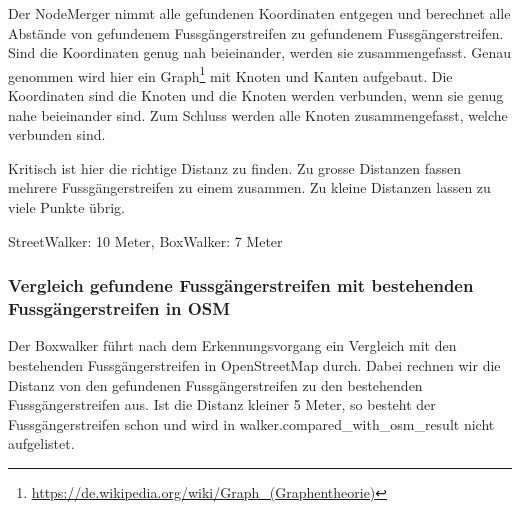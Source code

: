 Der NodeMerger nimmt alle gefundenen Koordinaten entgegen und berechnet alle Abstände von gefundenem Fussgängerstreifen zu gefundenem Fussgängerstreifen. Sind die Koordinaten genug nah beieinander, werden sie zusammengefasst. Genau genommen wird hier ein Graph\footnote{\url{https://de.wikipedia.org/wiki/Graph_(Graphentheorie)}} mit Knoten und Kanten aufgebaut. Die Koordinaten sind die Knoten und die Knoten werden verbunden, wenn sie genug nahe beieinander sind. Zum Schluss werden alle Knoten zusammengefasst, welche verbunden sind.

Kritisch ist hier die richtige Distanz zu finden. Zu grosse Distanzen fassen mehrere Fussgängerstreifen zu einem zusammen. Zu kleine Distanzen lassen zu viele Punkte übrig.

 StreetWalker: 10 Meter, BoxWalker: 7 Meter

\subsubsection{Vergleich gefundene Fussgängerstreifen mit bestehenden Fussgängerstreifen in OSM}
Der Boxwalker führt nach dem Erkennungsvorgang ein Vergleich mit den bestehenden Fussgängerstreifen in OpenStreetMap durch. Dabei rechnen wir die Distanz von den gefundenen Fussgängerstreifen zu den bestehenden Fussgängerstreifen aus. Ist die Distanz kleiner 5 Meter, so besteht der Fussgängerstreifen schon und wird in walker.compared\_with\_osm\_result nicht aufgelistet.








